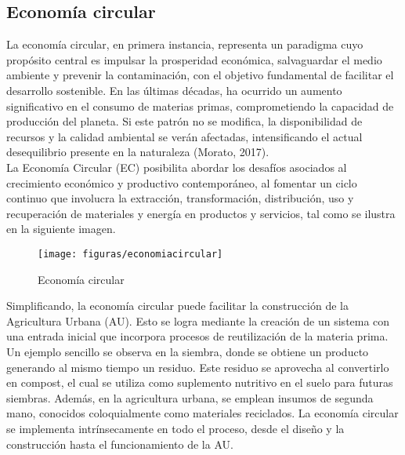 \documentclass[12pt]{article}
\begin{document}
\subsection{Economía circular}
La economía circular, en primera instancia, representa un paradigma cuyo propósito central es impulsar la prosperidad económica, salvaguardar el medio ambiente y prevenir la contaminación, con el objetivo fundamental de facilitar el desarrollo sostenible. En las últimas décadas, ha ocurrido un aumento significativo en el consumo de materias primas, comprometiendo la capacidad de producción del planeta. Si este patrón no se modifica, la disponibilidad de recursos y la calidad ambiental se verán afectadas, intensificando el actual desequilibrio presente en la naturaleza (Morato, 2017). \\
La Economía Circular (EC) posibilita abordar los desafíos asociados al crecimiento económico y productivo contemporáneo, al fomentar un ciclo continuo que involucra la extracción, transformación, distribución, uso y recuperación de materiales y energía en productos y servicios, tal como se ilustra en la siguiente imagen. \\
\begin{figure}[h]
	\centering
	\texttt{[image: figuras/economiacircular]}
	\caption{Economía circular}
	\label{fig:economiacircular} 
\end{figure} 
\newpage
Simplificando, la economía circular puede facilitar la construcción de la Agricultura Urbana (AU). Esto se logra mediante la creación de un sistema con una entrada inicial que incorpora procesos de reutilización de la materia prima. Un ejemplo sencillo se observa en la siembra, donde se obtiene un producto generando al mismo tiempo un residuo. Este residuo se aprovecha al convertirlo en compost, el cual se utiliza como suplemento nutritivo en el suelo para futuras siembras. Además, en la agricultura urbana, se emplean insumos de segunda mano, conocidos coloquialmente como materiales reciclados. La economía circular se implementa intrínsecamente en todo el proceso, desde el diseño y la construcción hasta el funcionamiento de la AU. \\
\end{document}

